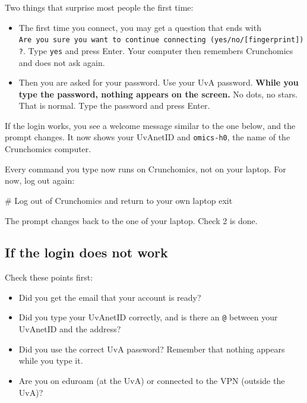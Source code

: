 \documentclass[
  letterpaper,
  DIV=11,
  numbers=noendperiod]{scrreprt}
\newenvironment{Shaded}{}{}
\newcommand{\BuiltInTok}[1]{\textcolor[rgb]{0.84,0.23,0.29}{#1}}
\newcommand{\CommentTok}[1]{\textcolor[rgb]{0.42,0.45,0.49}{#1}}
\providecommand{\tightlist}{%
  \setlength{\itemsep}{0pt}\setlength{\parskip}{0pt}}
\begin{document}
Two things that surprise most people the first time:

\begin{itemize}
\tightlist
\item
  The first time you connect, you may get a question that ends with
  \texttt{Are\ you\ sure\ you\ want\ to\ continue\ connecting\ (yes/no/{[}fingerprint{]})?}.
  Type \texttt{yes} and press Enter. Your computer then remembers
  Crunchomics and does not ask again.
\item
  Then you are asked for your password. Use your UvA password.
  \textbf{While you type the password, nothing appears on the screen.}
  No dots, no stars. That is normal. Type the password and press Enter.
\end{itemize}

If the login works, you see a welcome message similar to the one below,
and the prompt changes. It now shows your UvAnetID and
\texttt{omics-h0}, the name of the Crunchomics computer.

Every command you type now runs on Crunchomics, not on your laptop. For
now, log out again:

\begin{Shaded}
\begin{Highlighting}[]
\CommentTok{\# Log out of Crunchomics and return to your own laptop}
\BuiltInTok{exit}
\end{Highlighting}
\end{Shaded}

The prompt changes back to the one of your laptop. Check 2 is done.

\subsection{If the login does not
work}\label{if-the-login-does-not-work}

Check these points first:

\begin{itemize}
\tightlist
\item
  Did you get the email that your account is ready?
\item
  Did you type your UvAnetID correctly, and is there an \texttt{@}
  between your UvAnetID and the address?
\item
  Did you use the correct UvA password? Remember that nothing appears
  while you type it.
\item
  Are you on eduroam (at the UvA) or connected to the VPN (outside the
  UvA)?
\end{itemize}
\end{document}
